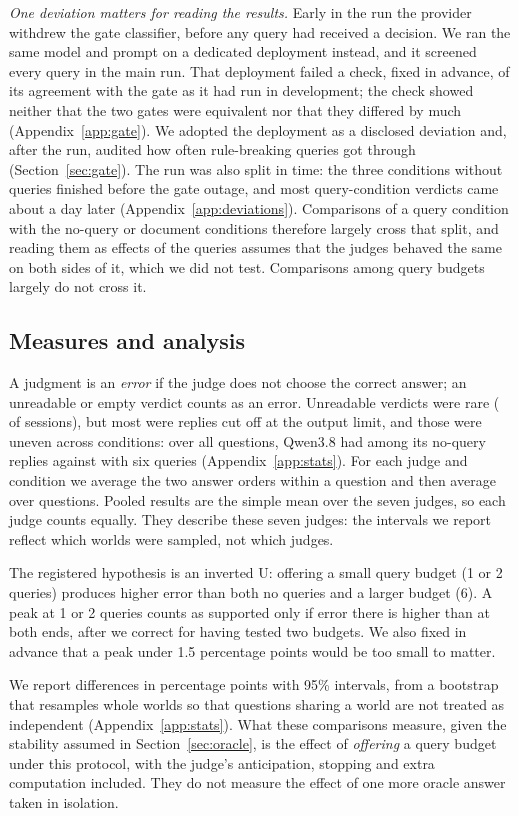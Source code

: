 \emph{One deviation matters for reading the results.} Early in the run the provider withdrew the gate classifier,
before any query had received a decision. We ran the same model and prompt on a dedicated deployment instead, and it
screened every query in the main run. That deployment failed a check, fixed in advance, of its agreement with the
gate as it had run in development; the check showed neither that the two gates were equivalent nor that they
differed by much (Appendix~\ref{app:gate}). We adopted the deployment as a disclosed deviation and, after the run,
audited how often rule-breaking queries got through (Section~\ref{sec:gate}). The run was also split in time: the
three conditions without queries finished before the gate outage, and most query-condition verdicts came about a day
later (Appendix~\ref{app:deviations}). Comparisons of a query condition with the no-query or document conditions
therefore largely cross that split, and reading them as effects of the queries assumes that the judges behaved the
same on both sides of it, which we did not test. Comparisons among query budgets largely do not cross it.

\subsection{Measures and analysis}
\label{sec:analysis}

A judgment is an \emph{error} if the judge does not choose the correct answer; an unreadable or empty verdict counts
as an error. Unreadable verdicts were rare (\nUnreadable{} of \nSevenSessions{} sessions), but most were replies cut
off at the output limit, and those were uneven across conditions: over all \nQuestions{} questions, Qwen3.8 had
\qwenCutZero{} among its no-query replies against \qwenCutSix{} with six queries (Appendix~\ref{app:stats}). For each judge and condition we average the two answer orders within
a question and then average over questions. Pooled results are the simple mean over the seven judges, so each judge
counts equally. They describe these seven judges: the intervals we report reflect which worlds were sampled, not
which judges.

The registered hypothesis is an inverted U: offering a small query budget (1 or 2 queries) produces higher error
than both no queries and a larger budget (6). A peak at 1 or 2 queries counts as supported only if error there is
higher than at both ends, after we correct for having tested two budgets. We also fixed in advance that a peak under 1.5 percentage points would be too small to matter.

We report differences in percentage points with 95\% intervals, from a bootstrap that resamples whole worlds so
that questions sharing a world are not treated as independent (Appendix~\ref{app:stats}). What these comparisons
measure, given the stability assumed in Section~\ref{sec:oracle}, is the effect of \emph{offering} a query budget
under this protocol, with the judge's anticipation, stopping and extra computation included. They do not measure
the effect of one more oracle answer taken in isolation.
